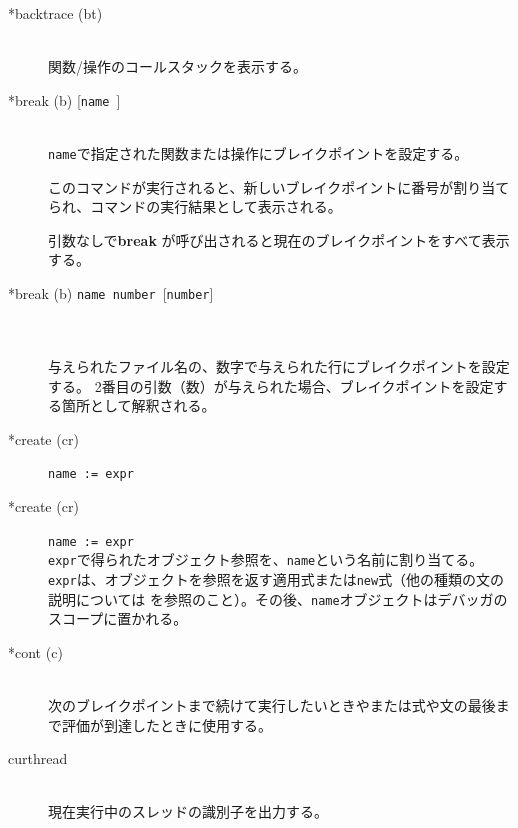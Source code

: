 \documentclass[\pformat,12pt]{jarticle}
\begin{document}
\begin{description}


\item[*backtrace (bt)] \mbox{}\\
  関数/操作のコールスタックを表示する。
  
\item[*break (b) \mbox{[{\tt name }]}] 
\mbox{}\\
  {\tt name}で指定された関数または操作にブレイクポイントを設定する。\\
  
  このコマンドが実行されると、新しいブレイクポイントに番号が割り当てられ、コマンドの実行結果として表示される。

  引数なしで\textbf{break} が呼び出されると現在のブレイクポイントをすべて表示する。

\item[*break (b) \mbox{\texttt{name number} [\texttt{number}]}]\mbox{}\\
\mbox{}\\
 与えられたファイル名の、数字で与えられた行にブレイクポイントを設定する。
 2番目の引数（数）が与えられた場合、ブレイクポイントを設定する箇所として解釈される。
 
\item[*create (cr)] {\tt name := expr}\mbox{}\\
\item[*create (cr)] {\tt name := expr}\mbox{}\\
  {\tt expr}で得られたオブジェクト参照を、{\tt name}という名前に割り当てる。
  {\tt expr}は、オブジェクトを参照を返す適用式または{\tt new}式（他の種類の文の説明については
  \cite{LangManPP-SCSK}を参照のこと）。その後、{\tt name}オブジェクトはデバッガのスコープに置かれる。

\item[*cont (c)] \mbox{}\\
  次のブレイクポイントまで続けて実行したいときやまたは式や文の最後まで評価が到達したときに使用する。


\item[curthread]\mbox{}\\
  現在実行中のスレッドの識別子を出力する。


\end{description}
\end{document}

